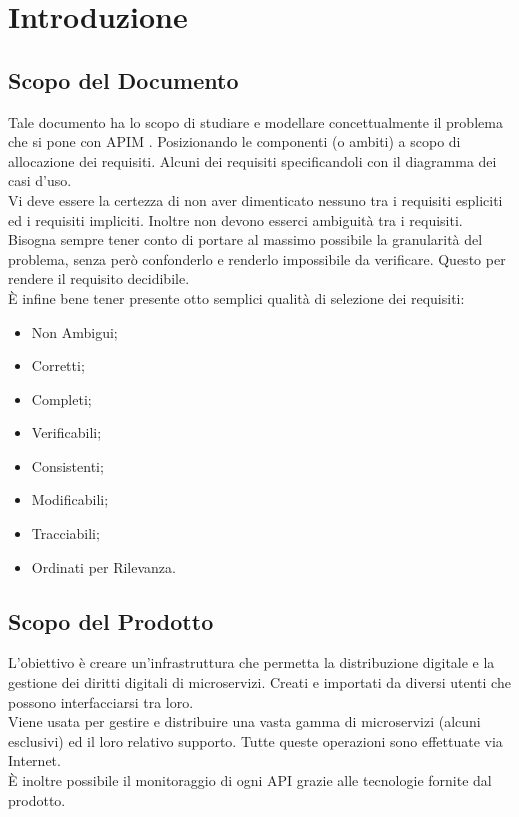 \documentclass[12pt,a4paper,titlepage]{article}
\begin{document}
	\newpage
	
	\section{Introduzione}
	\subsection{Scopo del Documento}
	Tale documento ha lo scopo di studiare e modellare concettualmente il problema che si pone con APIM . Posizionando le componenti (o ambiti) a scopo di allocazione dei requisiti. Alcuni dei requisiti specificandoli con il diagramma dei casi d'uso.\\
	Vi deve essere la certezza di non aver dimenticato nessuno tra i requisiti espliciti ed i requisiti impliciti. Inoltre non devono esserci ambiguità tra i requisiti.
	Bisogna sempre tener conto di portare al massimo possibile la granularità del problema, senza però confonderlo e renderlo impossibile da verificare. Questo per rendere il requisito decidibile.\\
	È infine bene tener presente otto semplici qualità di selezione dei requisiti:
	\begin{itemize}
		\item Non Ambigui;
		\item Corretti;
		\item Completi;
		\item Verificabili;
		\item Consistenti;
		\item Modificabili;
		\item Tracciabili;
		\item Ordinati per Rilevanza.
	\end{itemize}
	\subsection{Scopo del Prodotto}
	L'obiettivo è creare un'infrastruttura che permetta la distribuzione digitale e la gestione dei diritti digitali di microservizi. Creati e importati da diversi utenti che possono interfacciarsi tra loro.\\
	Viene usata per gestire e distribuire una vasta gamma di microservizi (alcuni esclusivi) ed il loro relativo supporto. Tutte queste operazioni sono effettuate via Internet.\\
	È inoltre possibile il monitoraggio di ogni API grazie alle tecnologie fornite dal prodotto.\\
	
\end{document}
